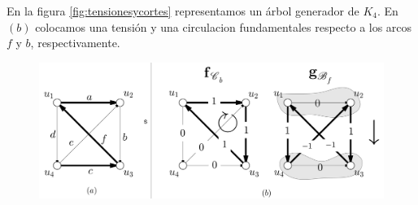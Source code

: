 En la figura \ref{fig:tensionesycortes} representamos un árbol generador de $K_{4}$. En $(b)$ colocamos una tensión y una circulacion  fundamentales respecto a los arcos $f$ y $b$, respectivamente. 

\begin{figure}[H]
    \centering
    \includegraphics[scale=0.2]{img/imgchapter3/tensionescirculacionesfundamentales.jpg}
    \caption{}
    \label{fig:tensionescirculacionesfund}
\end{figure}